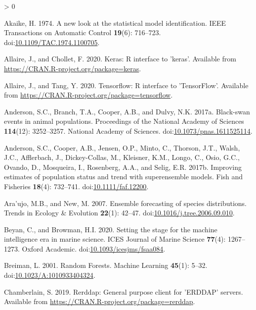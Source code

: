 \documentclass[
]{article}
\newlength{\cslhangindent}
\newenvironment{CSLReferences}[2] %
 {%
  \setlength{\parindent}{0pt}
  \ifodd #1 \everypar{\setlength{\hangindent}{\cslhangindent}}\ignorespaces\fi
  \ifnum #2 > 0
  \setlength{\parskip}{#2\baselineskip}
  \fi
 }%
 {}
\begin{document}
\hypertarget{refs}{}
\begin{CSLReferences}{1}{0}
\leavevmode\hypertarget{ref-akaike1974}{}%
Akaike, H. 1974. A new look at the statistical model identification. IEEE Transactions on Automatic Control \textbf{19}(6): 716--723. doi:\href{https://doi.org/10.1109/TAC.1974.1100705}{10.1109/TAC.1974.1100705}.

\leavevmode\hypertarget{ref-allaire2020a}{}%
Allaire, J., and Chollet, F. 2020. Keras: R interface to 'keras'. Available from \url{https://CRAN.R-project.org/package=keras}.

\leavevmode\hypertarget{ref-allaire2020}{}%
Allaire, J., and Tang, Y. 2020. Tensorflow: R interface to 'TensorFlow'. Available from \url{https://CRAN.R-project.org/package=tensorflow}.

\leavevmode\hypertarget{ref-anderson2017c}{}%
Anderson, S.C., Branch, T.A., Cooper, A.B., and Dulvy, N.K. 2017a. Black-swan events in animal populations. Proceedings of the National Academy of Sciences \textbf{114}(12): 3252--3257. {National Academy of Sciences}. doi:\href{https://doi.org/10.1073/pnas.1611525114}{10.1073/pnas.1611525114}.

\leavevmode\hypertarget{ref-anderson2017a}{}%
Anderson, S.C., Cooper, A.B., Jensen, O.P., Minto, C., Thorson, J.T., Walsh, J.C., Afflerbach, J., Dickey-Collas, M., Kleisner, K.M., Longo, C., Osio, G.C., Ovando, D., Mosqueira, I., Rosenberg, A.A., and Selig, E.R. 2017b. Improving estimates of population status and trend with superensemble models. Fish and Fisheries \textbf{18}(4): 732--741. doi:\href{https://doi.org/10.1111/faf.12200}{10.1111/faf.12200}.

\leavevmode\hypertarget{ref-araujo2007}{}%
Ara'ujo, M.B., and New, M. 2007. Ensemble forecasting of species distributions. Trends in Ecology \& Evolution \textbf{22}(1): 42--47. doi:\href{https://doi.org/10.1016/j.tree.2006.09.010}{10.1016/j.tree.2006.09.010}.

\leavevmode\hypertarget{ref-beyan2020}{}%
Beyan, C., and Browman, H.I. 2020. Setting the stage for the machine intelligence era in marine science. ICES Journal of Marine Science \textbf{77}(4): 1267--1273. {Oxford Academic}. doi:\href{https://doi.org/10.1093/icesjms/fsaa084}{10.1093/icesjms/fsaa084}.

\leavevmode\hypertarget{ref-breiman2001}{}%
Breiman, L. 2001. Random {Forests}. Machine Learning \textbf{45}(1): 5--32. doi:\href{https://doi.org/10.1023/A:1010933404324}{10.1023/A:1010933404324}.

\leavevmode\hypertarget{ref-chamberlain2019}{}%
Chamberlain, S. 2019. Rerddap: General purpose client for 'ERDDAP' servers. Available from \url{https://CRAN.R-project.org/package=rerddap}.


\end{CSLReferences}
\end{document}
